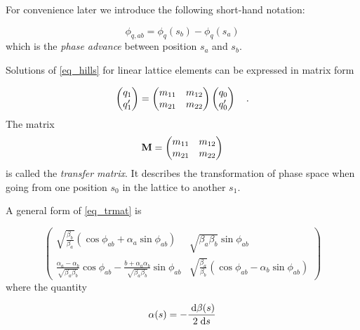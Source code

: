 For convenience later we introduce the following short-hand notation:

\begin{equation}
    \phi_{q,ab} = \phi_q(s_b) - \phi_q(s_a)
\end{equation}
which is the \emph{phase advance} between position $s_a$ and $s_b$.

Solutions of \eqref{eq_hills} for linear lattice elements can be expressed in matrix form

\begin{equation}
    \begin{pmatrix}
        q_1\\
        q_1'
    \end{pmatrix}
    =
    \begin{pmatrix}
        m_{11} & m_{12} \\
        m_{21} & m_{22}
    \end{pmatrix}
    \begin{pmatrix}
        q_0\\
        q_0'
    \end{pmatrix}
    \quad .
    \label{eq_matrix_element}
\end{equation}
The matrix 
\begin{equation}
    \mathbf{M} = 
    \begin{pmatrix}
        m_{11} & m_{12} \\
        m_{21} & m_{22}
    \end{pmatrix}
    \label{eq_trmat}
\end{equation}
is called the \emph{transfer matrix}. It describes the transformation
of phase space when going from one position $s_0$ in the lattice to another $s_1$.

A general form of \eqref{eq_trmat} is 

\begin{equation}
    \begin{pmatrix}
        \sqrt{\frac{\beta_b}{\beta_a}}(\cos\phi_{ab} + \alpha_a \sin\phi_{ab}) &
        \sqrt{\beta_a\beta_b} \sin\phi_{ab} \\
        \frac{\alpha_a - \alpha_b}{\sqrt{\beta_a\beta_b}}\cos\phi_{ab} - \frac{b+\alpha_a\alpha_b}{\sqrt{\beta_a\beta_b}}\sin\phi_{ab} &
        \sqrt{\frac{\beta_a}{\beta_b}}(\cos\phi_{ab} - \alpha_b\sin\phi_{ab})
    \end{pmatrix}
    \label{eq_trmat_01}
\end{equation}
where the quantity

\begin{equation}
    \alpha(s) = -\frac{\;\text{d} \beta(s)}{2 \;\text{d} s}
    \label{eq_alpha}
\end{equation}


